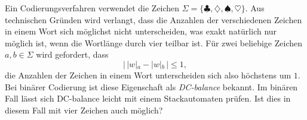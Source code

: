 Ein Codierungsverfahren verwendet die Zeichen
$\Sigma=\{
\clubsuit,
\diamondsuit,
\spadesuit,
\heartsuit
\}$.
Aus technischen Gründen wird verlangt, dass die Anzahlen der 
verschiedenen Zeichen in einem Wort sich möglichst nicht unterscheiden, was
exakt natürlich nur möglich ist, wenn die Wortlänge durch vier
teilbar ist.
Für zwei beliebige Zeichen $a,b\in\Sigma$ wird gefordert, dass
\[
|\, |w|_a - |w|_b\,|\le 1,
\]
die Anzahlen der Zeichen in einem Wort unterscheiden sich also höchstens
um $1$.
Bei binärer Codierung ist diese Eigenschaft
als {\em DC-balance} bekannt.
Im binären Fall lässt sich DC-balance leicht mit einem Stackautomaten
prüfen.
Ist dies in diesem Fall mit vier Zeichen auch möglich?


